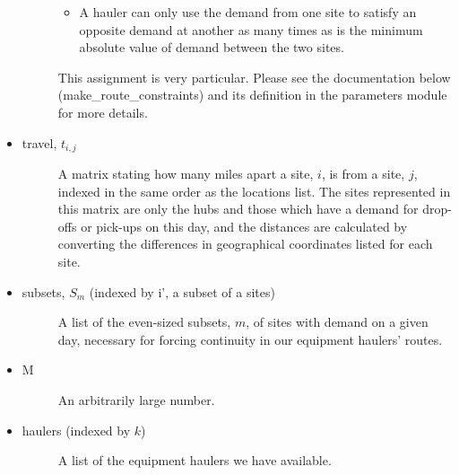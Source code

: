 \documentclass[letterpaper,10pt,english]{sphinxmanual}
\begin{document}
\begin{itemize}
\begin{description}
\begin{itemize}
\item {} 
A hauler can only use the demand from one site to satisfy an
opposite demand at another as many times as is the minimum absolute
value of demand between the two sites.

\end{itemize}

This assignment is very particular. Please see the documentation below
(make\_route\_constraints) and its definition in the parameters module
for more details.

\end{description}

\item {} \begin{description}
\item[{travel, \(t_{i,j}\)}] \leavevmode
A matrix stating how many miles apart a site, \(i\), is from a
site, \(j\), indexed in the same order as the locations list.
The sites represented in this matrix are only the hubs and those
which have a demand for drop-offs or pick-ups on this day, and the
distances are calculated by converting the differences in
geographical coordinates listed for each site.

\end{description}

\item {} \begin{description}
\item[{subsets, \(S_{m}\) (indexed by i', a subset of a sites)}] \leavevmode
A list of the even-sized subsets, \(m\), of sites with demand on a
given day, necessary for forcing continuity in our equipment haulers'
routes.

\end{description}

\item {} \begin{description}
\item[{M}] \leavevmode
An arbitrarily large number.

\end{description}

\item {} \begin{description}
\item[{haulers (indexed by \(k\))}] \leavevmode
A list of the equipment haulers we have available.

\end{description}

\end{itemize}
\end{document}
